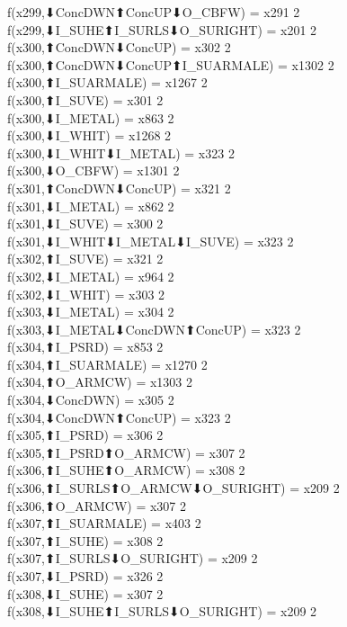 f(x299,⬇ConcDWN⬆ConcUP⬇O_CBFW) = x291 {2} \\
f(x299,⬇I_SUHE⬆I_SURLS⬇O_SURIGHT) = x201 {2} \\
f(x300,⬆ConcDWN⬇ConcUP) = x302 {2} \\
f(x300,⬆ConcDWN⬇ConcUP⬆I_SUARMALE) = x1302 {2} \\
f(x300,⬆I_SUARMALE) = x1267 {2} \\
f(x300,⬆I_SUVE) = x301 {2} \\
f(x300,⬇I_METAL) = x863 {2} \\
f(x300,⬇I_WHIT) = x1268 {2} \\
f(x300,⬇I_WHIT⬇I_METAL) = x323 {2} \\
f(x300,⬇O_CBFW) = x1301 {2} \\
f(x301,⬆ConcDWN⬇ConcUP) = x321 {2} \\
f(x301,⬇I_METAL) = x862 {2} \\
f(x301,⬇I_SUVE) = x300 {2} \\
f(x301,⬇I_WHIT⬇I_METAL⬇I_SUVE) = x323 {2} \\
f(x302,⬆I_SUVE) = x321 {2} \\
f(x302,⬇I_METAL) = x964 {2} \\
f(x302,⬇I_WHIT) = x303 {2} \\
f(x303,⬇I_METAL) = x304 {2} \\
f(x303,⬇I_METAL⬇ConcDWN⬆ConcUP) = x323 {2} \\
f(x304,⬆I_PSRD) = x853 {2} \\
f(x304,⬆I_SUARMALE) = x1270 {2} \\
f(x304,⬆O_ARMCW) = x1303 {2} \\
f(x304,⬇ConcDWN) = x305 {2} \\
f(x304,⬇ConcDWN⬆ConcUP) = x323 {2} \\
f(x305,⬆I_PSRD) = x306 {2} \\
f(x305,⬆I_PSRD⬆O_ARMCW) = x307 {2} \\
f(x306,⬆I_SUHE⬆O_ARMCW) = x308 {2} \\
f(x306,⬆I_SURLS⬆O_ARMCW⬇O_SURIGHT) = x209 {2} \\
f(x306,⬆O_ARMCW) = x307 {2} \\
f(x307,⬆I_SUARMALE) = x403 {2} \\
f(x307,⬆I_SUHE) = x308 {2} \\
f(x307,⬆I_SURLS⬇O_SURIGHT) = x209 {2} \\
f(x307,⬇I_PSRD) = x326 {2} \\
f(x308,⬇I_SUHE) = x307 {2} \\
f(x308,⬇I_SUHE⬆I_SURLS⬇O_SURIGHT) = x209 {2} \\
